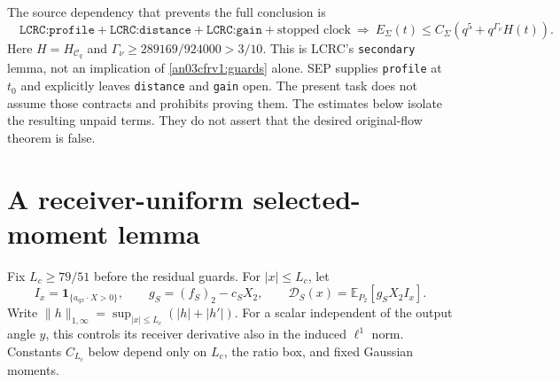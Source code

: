 \documentclass[11pt]{article}
\theoremstyle{remark}\newtheorem{remark}[proposition]{Remark}
\newcommand{\E}{\mathbb E}
\newcommand{\one}{\mathbf1}
\begin{document}
The source dependency that prevents the full conclusion is
\begin{equation}
 \boxed{\quad
 \texttt{LCRC:profile}+\texttt{LCRC:distance}
       +\texttt{LCRC:gain}+\text{stopped clock}
 \ \Longrightarrow\
 E_\Sigma(t)\le C_\Sigma(q^5+q^{\Gamma_\nu}H(t)).
 \quad}
 \label{an03cfrv1:dependency}
\end{equation}
Here $H=H_{\mathcal C_q}$ and
$\Gamma_\nu\ge289169/924000>3/10$.
This is LCRC's \texttt{secondary} lemma, not an implication
of \eqref{an03cfrv1:guards} alone.
SEP supplies \texttt{profile} at $t_0$ and explicitly leaves
\texttt{distance} and \texttt{gain} open. The present task
does not assume those contracts and prohibits proving them.
The estimates below isolate the resulting unpaid terms.
They do not assert that the desired original-flow theorem is false.

\section{A receiver-uniform selected-moment lemma}
Fix $L_c\ge79/51$ before the residual guards.
For $|x|\le L_c$, let
\[
 I_x=\one_{\{a_{qx}\cdot X>0\}},\qquad
 g_S=(f_S)_2-c_SX_2,\qquad
 \mathcal D_S(x)=\E_{P_2}[g_S X_2 I_x].
\]
Write $\|h\|_{1,\infty}=\sup_{|x|\le L_c}(|h|+|h'|)$.
For a scalar independent of the output angle $y$, this controls
its receiver derivative also in the induced $\ell^1$ norm.
Constants $C_{L_c}$ below depend only on $L_c$, the ratio box,
and fixed Gaussian moments.
\end{document}
